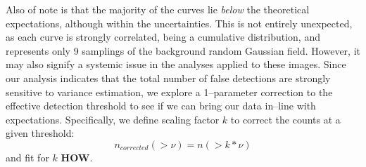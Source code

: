 \documentclass[floatfix, apj]{emulateapj}
\begin{document}
Also of note is that the majority of the curves lie {\it below} the theoretical expectations, although within the uncertainties.
This is not entirely unexpected, as each curve is strongly correlated, being a cumulative distribution, and represents only 9 samplings of the background random Gaussian field.
However, it may also signify a systemic issue in the analyses applied to these images.
Since our analysis indicates that the total number of false detections are strongly sensitive to variance estimation, we explore a 1--parameter correction to the effective detection threshold to see if we can bring our data in--line with expectations.
Specifically, we define scaling factor $k$ to correct the counts at a given threshold:
\begin{equation}
n_{corrected}(>\nu) = n(> k * \nu)
\label{correction}
\end{equation}
and fit for $k$ {\bf HOW}.
\end{document}
